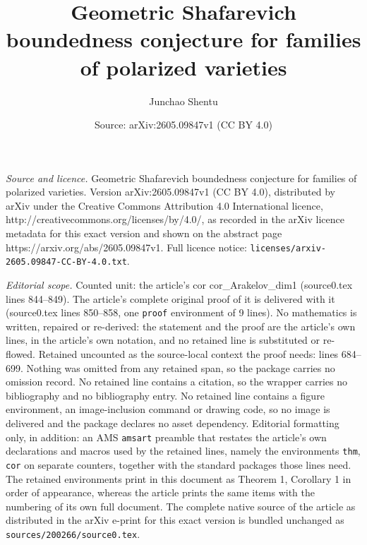 \documentclass[10pt,a4paper]{amsart}
\title{Geometric Shafarevich boundedness conjecture for families of polarized varieties}
\author{Junchao Shentu}
\date{Source: arXiv:2605.09847v1 (CC BY 4.0)}
\begin{document}
\maketitle

\noindent\emph{Source and licence.} Geometric Shafarevich boundedness conjecture for families of polarized varieties. Version arXiv:2605.09847v1 (CC BY 4.0), distributed by arXiv under the Creative Commons Attribution 4.0 International licence, http://creativecommons.org/licenses/by/4.0/, as recorded in the arXiv licence metadata for this exact version and shown on the abstract page https://arxiv.org/abs/2605.09847v1. Full licence notice: \texttt{licenses/arxiv-2605.09847-CC-BY-4.0.txt}.\par\smallskip

\noindent\textit{Editorial scope.} Counted unit: the article's cor cor\_Arakelov\_dim1 (source0.tex lines 844--849). The article's complete original proof of it is delivered with it (source0.tex lines 850--858, one \texttt{proof} environment of 9 lines). No mathematics is written, repaired or re-derived: the statement and the proof are the article's own lines, in the article's own notation, and no retained line is substituted or re-flowed.  Retained uncounted as the source-local context the proof needs: lines 684--699.  Nothing was omitted from any retained span, so the package carries no omission record.  No retained line contains a citation, so the wrapper carries no bibliography and no bibliography entry.  No retained line contains a figure environment, an image-inclusion command or drawing code, so no image is delivered and the package declares no asset dependency.  Editorial formatting only, in addition: an AMS \texttt{amsart} preamble that restates the article's own declarations and macros used by the retained lines, namely the environments \texttt{thm}, \texttt{cor} on separate counters, together with the standard packages those lines need.  The retained environments print in this document as Theorem 1, Corollary 1 in order of appearance, whereas the article prints the same items with the numbering of its own full document.  The complete native source of the article as distributed in the arXiv e-print for this exact version is bundled unchanged as \texttt{sources/200266/source0.tex}.
\end{document}
